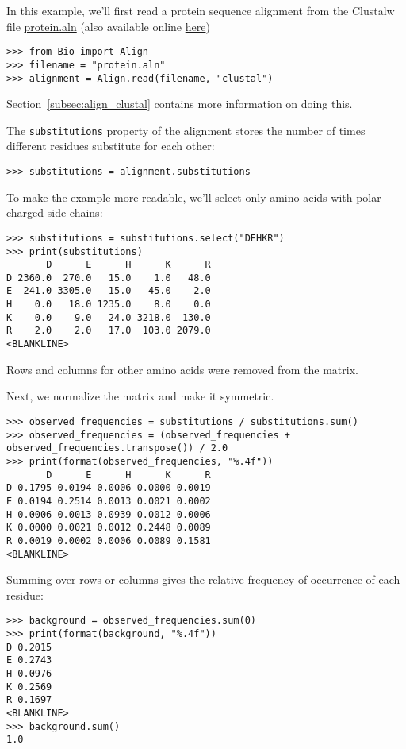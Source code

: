 In this example, we'll first read a protein sequence alignment from the Clustalw file \href{examples/protein.aln}{protein.aln} (also available online
\href{https://raw.githubusercontent.com/biopython/biopython/master/Tests/Clustalw/protein.aln}{here})

\begin{verbatim}
>>> from Bio import Align
>>> filename = "protein.aln"
>>> alignment = Align.read(filename, "clustal")
\end{verbatim}

Section~\ref{subsec:align_clustal} contains more information on doing this.

The \verb+substitutions+ property of the alignment stores the number of times
different residues substitute for each other:
\begin{verbatim}
>>> substitutions = alignment.substitutions
\end{verbatim}

To make the example more readable, we'll select only amino acids with polar charged side chains:

\begin{verbatim}
>>> substitutions = substitutions.select("DEHKR")
>>> print(substitutions)
       D      E      H      K      R
D 2360.0  270.0   15.0    1.0   48.0
E  241.0 3305.0   15.0   45.0    2.0
H    0.0   18.0 1235.0    8.0    0.0
K    0.0    9.0   24.0 3218.0  130.0
R    2.0    2.0   17.0  103.0 2079.0
<BLANKLINE>
\end{verbatim}
Rows and columns for other amino acids were removed from the matrix.

Next, we normalize the matrix and make it symmetric.
\begin{verbatim}
>>> observed_frequencies = substitutions / substitutions.sum()
>>> observed_frequencies = (observed_frequencies + observed_frequencies.transpose()) / 2.0
>>> print(format(observed_frequencies, "%.4f"))
       D      E      H      K      R
D 0.1795 0.0194 0.0006 0.0000 0.0019
E 0.0194 0.2514 0.0013 0.0021 0.0002
H 0.0006 0.0013 0.0939 0.0012 0.0006
K 0.0000 0.0021 0.0012 0.2448 0.0089
R 0.0019 0.0002 0.0006 0.0089 0.1581
<BLANKLINE>
\end{verbatim}

Summing over rows or columns gives the relative frequency of occurrence of
each residue:
\begin{verbatim}
>>> background = observed_frequencies.sum(0)
>>> print(format(background, "%.4f"))
D 0.2015
E 0.2743
H 0.0976
K 0.2569
R 0.1697
<BLANKLINE>
>>> background.sum()
1.0
\end{verbatim}


